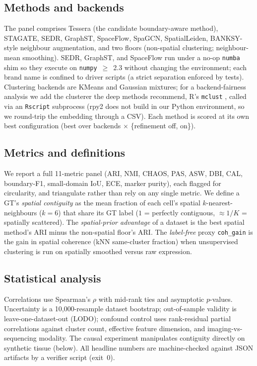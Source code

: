\documentclass[journal]{IEEEtran}
\begin{document}
\subsection{Methods and backends}
The panel comprises Tessera (the candidate boundary-aware method),
STAGATE, SEDR, GraphST, SpaceFlow, SpaGCN, SpatialLeiden, BANKSY-style neighbour augmentation, and two
floors (non-spatial clustering; neighbour-mean smoothing). SEDR, GraphST, and SpaceFlow run under a no-op
\texttt{numba} shim so they execute on \texttt{numpy}~$\geq$~2.3 without changing the environment; each
brand name is confined to driver scripts (a strict separation enforced by tests). Clustering backends are
KMeans \citep{macqueen1967kmeans} and Gaussian mixtures; for a backend-fairness analysis we add
the clusterer the deep methods recommend, R's \texttt{mclust} \citep{scrucca2016mclust}, called
via an \texttt{Rscript} subprocess (rpy2 does not build in our Python environment, so we round-trip
the embedding through a CSV). Each method is scored at its own best configuration (best over backends
$\times$ \{refinement off, on\}).

\subsection{Metrics and definitions}
We report a full 11-metric panel (ARI, NMI, CHAOS, PAS, ASW, DBI, CAL,
boundary-F1, small-domain IoU, ECE, marker purity), each flagged for circularity, and triangulate rather
than rely on any single metric. We define a GT's \emph{spatial contiguity} as the mean fraction of each
cell's spatial $k$-nearest-neighbours ($k{=}6$) that share its GT label ($1$ = perfectly contiguous,
$\approx 1/K$ = spatially scattered). The \emph{spatial-prior advantage} of a dataset is the best spatial
method's ARI minus the non-spatial floor's ARI. The \emph{label-free} proxy \texttt{coh\_gain} is the gain
in spatial coherence (kNN same-cluster fraction) when unsupervised clustering is run on spatially smoothed
versus raw expression.

\subsection{Statistical analysis}
Correlations use Spearman's $\rho$ with mid-rank ties and asymptotic $p$-values.
Uncertainty is a 10{,}000-resample dataset bootstrap; out-of-sample validity is leave-one-dataset-out
(LODO); confound control uses rank-residual partial correlations against cluster count, effective feature
dimension, and imaging-vs-sequencing modality. The causal experiment manipulates contiguity directly on
synthetic tissue (below). All headline numbers are machine-checked against JSON artifacts by a verifier
script (exit~0).
\end{document}
